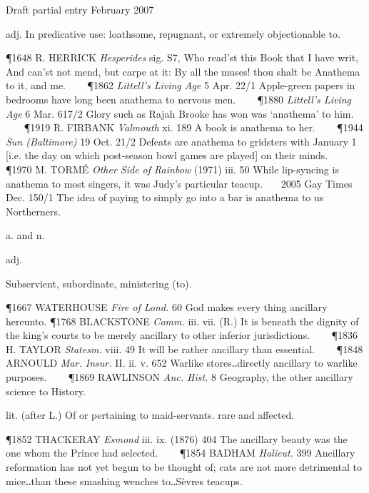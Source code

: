 \begin{description}[wide, labelwidth=!, labelindent=0pt]
\begin{myenumerate}
Draft partial entry February 2007

 adj. In predicative use: loathsome, repugnant, or extremely objectionable to. 

\P 1648 R. HERRICK \textit{Hesperides} sig. S7, Who read'st this Book that I have writ, And can'st not mend, but carpe at it: By all the muses! thou shalt be Anathema to it, and me.    
\P 1862 \textit{Littell's Living Age} 5 Apr. 22/1 Apple-green papers in bedrooms have long been anathema to nervous men.    
\P 1880 \textit{Littell's Living Age} 6 Mar. 617/2 Glory such as Rajah Brooke has won was ‘anathema’ to him.    
\P 1919 R. FIRBANK \textit{Valmouth} xi. 189 A book is anathema to her.    
\P 1944 \textit{Sun (Baltimore)} 19 Oct. 21/2 Defeats are anathema to gridsters with January 1 [i.e. the day on which post-season bowl games are played] on their minds.    
\P 1970 M. TORMÉ \textit{Other Side of Rainbow} (1971) iii. 50 While lip-syncing is anathema to most singers, it was Judy's particular teacup.    2005 Gay Times Dec. 150/1 The idea of paying to simply go into a bar is anathema to us Northerners.
\end{myenumerate}

  a. and n.

\noindent  {}

\vspace{-0.3cm}

\begin{myenumerate}
 adj. 

 Subservient, subordinate, ministering (to). 

\P 1667 WATERHOUSE \textit{Fire of Lond.} 60 God makes every thing ancillary hereunto.
\P 1768 BLACKSTONE \textit{Comm.} iii. vii. (R.) It is beneath the dignity of the king's
courts to be merely ancillary to other inferior jurisdictions.    
\P 1836 H. TAYLOR \textit{Statesm.} viii. 49 It will be rather ancillary than essential.    
\P 1848 ARNOULD \textit{Mar. Insur.} II. ii. v. 652 Warlike stores‥directly ancillary to warlike
purposes.    
\P 1869 RAWLINSON \textit{Anc. Hist.} 8 Geography, the other ancillary science
to History.

 lit. (after L.) Of or pertaining to maid-servants. rare and affected. 

\P 1852 THACKERAY \textit{Esmond} iii. ix. (1876) 404 The ancillary beauty was the one
whom the Prince had selected.    
\P 1854 BADHAM \textit{Halieut.} 399 Ancillary reformation
has not yet begun to be thought of; cats are not more detrimental to mice‥than
these smashing wenches to‥Sèvres teacups.


\end{myenumerate}
\end{description}
